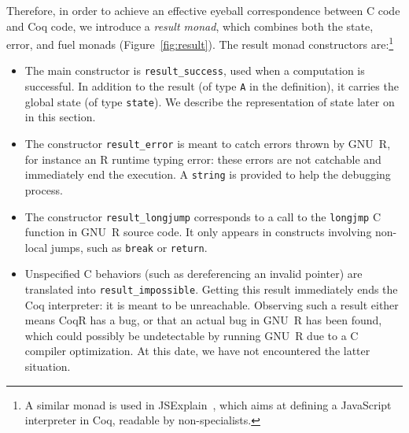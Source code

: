 \documentclass[
    sigplan,
    10pt,
    review, %
    natbib=false %
 ]{acmart}
\newcommand\CoqR{CoqR}
\begin{document}
Therefore, in order to achieve an effective eyeball correspondence between C code and Coq code, we introduce a {\em result monad}, which combines both the state, error, and fuel monads (Figure~\ref{fig:result}).%
%
The result monad constructors are:\footnote{A similar monad is used in JSExplain~\parencite{JSExplain}, which aims at defining a JavaScript interpreter in Coq, readable by non-specialists.
}
\begin{itemize}[leftmargin=0.5em]
\item The main constructor is \texttt{result_success}, used when a computation is successful.
In addition to the result (of type \texttt{A} in the definition),
it carries the global state (of type \texttt{state}). We describe the representation of state later on in this section.
%
\item The constructor \texttt{result_error} is meant to catch
errors thrown by GNU~R, for instance an R runtime typing error:
these errors are not catchable and immediately end the execution.
A \texttt{string} is provided to help the debugging process.
%
\item The constructor \texttt{result_longjump}
corresponds to a call to the \texttt{longjmp}
C function in GNU~R source code.
It only appears in constructs involving non-local jumps,
such as \texttt{break} or \texttt{return}.
%
\item Unspecified C behaviors
(such as dereferencing an invalid pointer)
are translated into
\texttt{result_impossible}.
Getting this result immediately ends the Coq interpreter:
it is meant to be unreachable.
Observing such a result either means \CoqR{} has a bug, or that an actual bug in GNU~R has been found, which could possibly be undetectable by running GNU~R due to a C compiler optimization. At this date, we have not encountered the latter situation.

\end{itemize}
\end{document}
